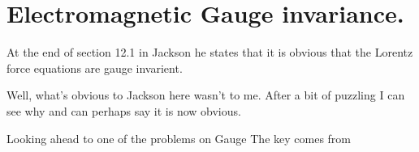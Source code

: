 

\chapter{Electromagnetic Gauge invariance.}
\label{chap:jackson12Dash9Gauge}
{}
\date{Sept 24, 2009}

\beginArtNoToc


At the end of section 12.1 in Jackson \cite{jackson1975cew} he states that it is obvious that the Lorentz force equations are gauge invarient.



Well, what's obvious to Jackson here wasn't to me.  After a bit of puzzling I can see why and can perhaps say it is now obvious.

Looking ahead to one of the problems on Gauge 
The key comes from 




\EndArticle
